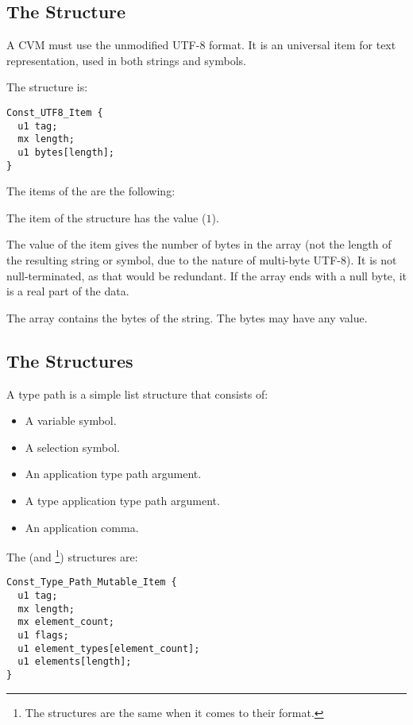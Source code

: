 \subsection{The  Structure}

A CVM must use the unmodified UTF-8 format. It is an universal item for text representation, used in both strings and symbols. 

The  structure is:
\begin{lstlisting}
Const_UTF8_Item {
  u1 tag;
  mx length;
  u1 bytes[length];
}
\end{lstlisting}

The items of the  are the following:
\begin{description}[font=\ttfamily\mdseries,style=nextline]
  \item[tag]
  The  item of the  structure has the value  ($1$). 
  \item[length]
  The value of the  item gives the number of bytes in the  array (not the length of the resulting string or symbol, due to the nature of multi-byte \mbox{UTF-8}). It is not null-terminated, as that would be redundant. If the array ends with a null byte, it is a real part of the data. 
  \item[bytes]
  The  array contains the bytes of the string. The bytes may have any value. 
\end{description}





\subsection{The  Structures}

A type path is a simple list structure that consists of: 
\begin{itemize}
  \item A variable symbol. 
  \item A selection symbol. 
  \item An application type path argument. 
  \item A type application type path argument. 
  \item An application comma.
\end{itemize}

The  (and \footnote{The structures are the same when it comes to their format.}) structures are:
\begin{lstlisting}
Const_Type_Path_Mutable_Item {
  u1 tag;
  mx length;
  mx element_count;
  u1 flags;
  u1 element_types[element_count];
  u1 elements[length];
}
\end{lstlisting}

